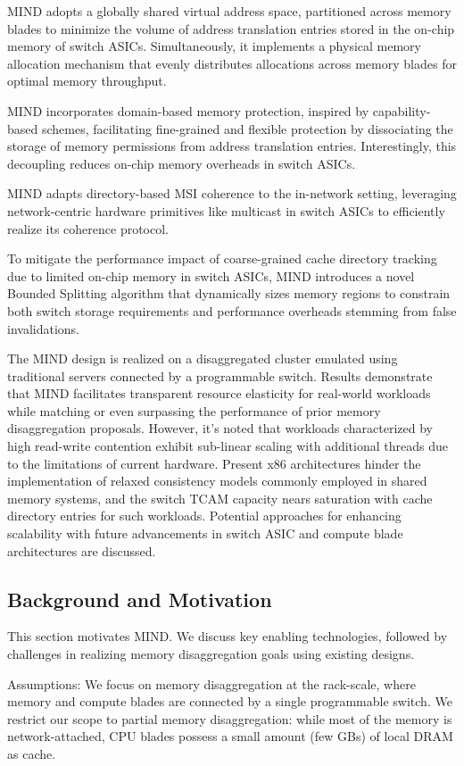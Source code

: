 MIND adopts a globally shared virtual address space, partitioned across memory blades to minimize the volume of address translation entries stored in the on-chip memory of switch ASICs. Simultaneously, it implements a physical memory allocation mechanism that evenly distributes allocations across memory blades for optimal memory throughput.

MIND incorporates domain-based memory protection, inspired by capability-based schemes, facilitating fine-grained and flexible protection by dissociating the storage of memory permissions from address translation entries. Interestingly, this decoupling reduces on-chip memory overheads in switch ASICs.

MIND adapts directory-based MSI coherence to the in-network setting, leveraging network-centric hardware primitives like multicast in switch ASICs to efficiently realize its coherence protocol.

To mitigate the performance impact of coarse-grained cache directory tracking due to limited on-chip memory in switch ASICs, MIND introduces a novel Bounded Splitting algorithm that dynamically sizes memory regions to constrain both switch storage requirements and performance overheads stemming from false invalidations.

The MIND design is realized on a disaggregated cluster emulated using traditional servers connected by a programmable switch. Results demonstrate that MIND facilitates transparent resource elasticity for real-world workloads while matching or even surpassing the performance of prior memory disaggregation proposals. However, it's noted that workloads characterized by high read-write contention exhibit sub-linear scaling with additional threads due to the limitations of current hardware. Present x86 architectures hinder the implementation of relaxed consistency models commonly employed in shared memory systems, and the switch TCAM capacity nears saturation with cache directory entries for such workloads. Potential approaches for enhancing scalability with future advancements in switch ASIC and compute blade architectures are discussed.
\subsection{Background and Motivation}
This section motivates MIND. We discuss key enabling technologies, followed by challenges in realizing memory disaggregation goals using existing designs.

Assumptions: We focus on memory disaggregation at the rack-scale, where memory and compute blades are connected by a single programmable switch. We restrict our scope to partial memory disaggregation: while most of the memory is network-attached, CPU blades possess a small amount (few GBs) of local DRAM as cache.


